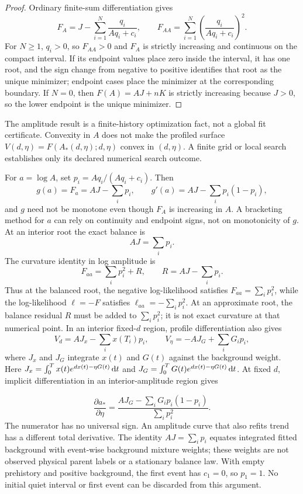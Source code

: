 \begin{proof}
Ordinary finite-sum differentiation gives
\[
F_A=J-\sum_{i=1}^{N}\frac{q_i}{Aq_i+c_i},
\qquad
F_{AA}=\sum_{i=1}^{N}
\left(\frac{q_i}{Aq_i+c_i}\right)^2.
\]
For \(N\ge1\), \(q_i>0\), so \(F_{AA}>0\) and \(F_A\) is strictly increasing and continuous on the compact interval. If its endpoint values place zero inside the interval, it has one root, and the sign change from negative to positive identifies that root as the unique minimizer; endpoint cases place the minimizer at the corresponding boundary. If \(N=0\), then \(F(A)=AJ+nK\) is strictly increasing because \(J>0\), so the lower endpoint is the unique minimizer.
\end{proof}

The amplitude result is a finite-history optimization fact, not a global fit certificate. Convexity in \(A\) does not make the profiled surface \(V(d,\eta)=F(A_*(d,\eta);d,\eta)\) convex in \((d,\eta)\). A finite grid or local search establishes only its declared numerical search outcome.

For \(a=\log A\), set \(p_i=Aq_i/(Aq_i+c_i)\). Then
\[
g(a)=F_a=AJ-\sum_i p_i,
\qquad
g'(a)=AJ-\sum_i p_i(1-p_i),
\]
and \(g\) need not be monotone even though \(F_A\) is increasing in \(A\). A bracketing method for \(a\) can rely on continuity and endpoint signs, not on monotonicity of \(g\). At an interior root the exact balance is
\[
AJ=\sum_i p_i.
\]
The curvature identity in log amplitude is
\[
F_{aa}=\sum_i p_i^2+R,
\qquad
R=AJ-\sum_i p_i.
\]
Thus at the balanced root, the negative log-likelihood satisfies
\(F_{aa}=\sum_i p_i^2\), while the log-likelihood \(\ell=-F\) satisfies
\(\ell_{aa}=-\sum_i p_i^2\). At an approximate root, the balance residual \(R\) must be added to \(\sum_i p_i^2\); it is not exact curvature at that numerical point. In an interior fixed-\(d\) region, profile differentiation also gives
\[
V_d=AJ_x-\sum_i x(T_i)p_i,
\qquad
V_\eta=-AJ_G+\sum_i G_ip_i,
\]
where \(J_x\) and \(J_G\) integrate \(x(t)\) and \(G(t)\) against the background weight. Here \(J_x=\int_0^Tx(t)e^{dx(t)-\eta G(t)}\mathop{}\!\mathrm{d} t\) and \(J_G=\int_0^TG(t)e^{dx(t)-\eta G(t)}\mathop{}\!\mathrm{d} t\). At fixed \(d\), implicit differentiation in an interior-amplitude region gives

\[
\frac{\partial a_*}{\partial\eta}
=\frac{AJ_G-\sum_iG_ip_i(1-p_i)}{\sum_i p_i^2}.
\]
The numerator has no universal sign. An amplitude curve that also refits trend has a different total derivative. The identity \(AJ=\sum_i p_i\) equates integrated fitted background with event-wise background mixture weights; these weights are not observed physical parent labels or a stationary balance law. With empty prehistory and positive background, the first event has \(c_1=0\), so \(p_1=1\). No initial quiet interval or first event can be discarded from this argument.

